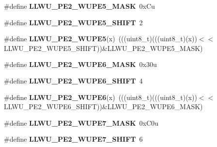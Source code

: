 \begin{DoxyCompactItemize}
\item 
\#define {\bfseries L\+L\+W\+U\+\_\+\+P\+E2\+\_\+\+W\+U\+P\+E5\+\_\+\+M\+A\+SK}~0x\+Cu\hypertarget{group__LLWU__Register__Masks_gacfb855231e7a1c11c64d8b4e951817be}{}\label{group__LLWU__Register__Masks_gacfb855231e7a1c11c64d8b4e951817be}

\item 
\#define {\bfseries L\+L\+W\+U\+\_\+\+P\+E2\+\_\+\+W\+U\+P\+E5\+\_\+\+S\+H\+I\+FT}~2\hypertarget{group__LLWU__Register__Masks_ga4e823ada9bfc21dca4729eedf4e63778}{}\label{group__LLWU__Register__Masks_ga4e823ada9bfc21dca4729eedf4e63778}

\item 
\#define {\bfseries L\+L\+W\+U\+\_\+\+P\+E2\+\_\+\+W\+U\+P\+E5}(x)~(((uint8\+\_\+t)(((uint8\+\_\+t)(x))$<$$<$L\+L\+W\+U\+\_\+\+P\+E2\+\_\+\+W\+U\+P\+E5\+\_\+\+S\+H\+I\+FT))\&L\+L\+W\+U\+\_\+\+P\+E2\+\_\+\+W\+U\+P\+E5\+\_\+\+M\+A\+SK)\hypertarget{group__LLWU__Register__Masks_ga956b7d4a8e1a041de809612c0cad83e3}{}\label{group__LLWU__Register__Masks_ga956b7d4a8e1a041de809612c0cad83e3}

\item 
\#define {\bfseries L\+L\+W\+U\+\_\+\+P\+E2\+\_\+\+W\+U\+P\+E6\+\_\+\+M\+A\+SK}~0x30u\hypertarget{group__LLWU__Register__Masks_ga0db50e96153e1ca74874da97d1c22f41}{}\label{group__LLWU__Register__Masks_ga0db50e96153e1ca74874da97d1c22f41}

\item 
\#define {\bfseries L\+L\+W\+U\+\_\+\+P\+E2\+\_\+\+W\+U\+P\+E6\+\_\+\+S\+H\+I\+FT}~4\hypertarget{group__LLWU__Register__Masks_gaa7a0191eaf60166333a8bee953239c85}{}\label{group__LLWU__Register__Masks_gaa7a0191eaf60166333a8bee953239c85}

\item 
\#define {\bfseries L\+L\+W\+U\+\_\+\+P\+E2\+\_\+\+W\+U\+P\+E6}(x)~(((uint8\+\_\+t)(((uint8\+\_\+t)(x))$<$$<$L\+L\+W\+U\+\_\+\+P\+E2\+\_\+\+W\+U\+P\+E6\+\_\+\+S\+H\+I\+FT))\&L\+L\+W\+U\+\_\+\+P\+E2\+\_\+\+W\+U\+P\+E6\+\_\+\+M\+A\+SK)\hypertarget{group__LLWU__Register__Masks_gaa96b35faf789a4b85552957c8227c1e0}{}\label{group__LLWU__Register__Masks_gaa96b35faf789a4b85552957c8227c1e0}

\item 
\#define {\bfseries L\+L\+W\+U\+\_\+\+P\+E2\+\_\+\+W\+U\+P\+E7\+\_\+\+M\+A\+SK}~0x\+C0u\hypertarget{group__LLWU__Register__Masks_ga39b30f51fdd7f83bb5aa29bf2bc87c26}{}\label{group__LLWU__Register__Masks_ga39b30f51fdd7f83bb5aa29bf2bc87c26}

\item 
\#define {\bfseries L\+L\+W\+U\+\_\+\+P\+E2\+\_\+\+W\+U\+P\+E7\+\_\+\+S\+H\+I\+FT}~6\hypertarget{group__LLWU__Register__Masks_ga82bfb99732d7f90dacdc01ef5222a59a}{}\label{group__LLWU__Register__Masks_ga82bfb99732d7f90dacdc01ef5222a59a}


\end{DoxyCompactItemize}
